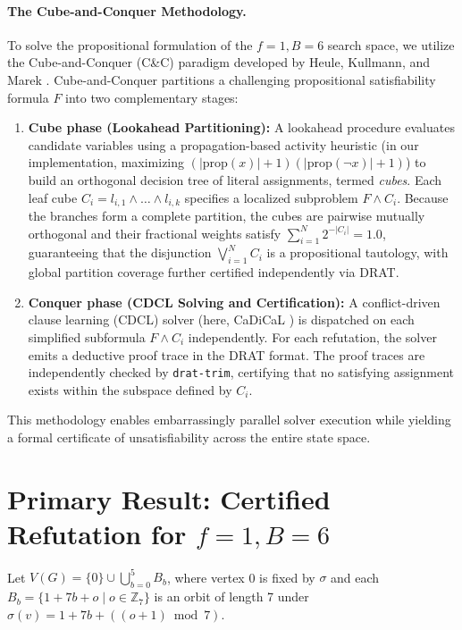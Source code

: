 \documentclass[11pt,a4paper]{article}
\theoremstyle{definition}
\begin{document}
\paragraph{The Cube-and-Conquer Methodology.}
To solve the propositional formulation of the $f=1, B=6$ search space, we utilize the Cube-and-Conquer (C\&C) paradigm developed by Heule, Kullmann, and Marek \cite{heule2016}. Cube-and-Conquer partitions a challenging propositional satisfiability formula $F$ into two complementary stages:
\begin{enumerate}
    \item \textbf{Cube phase (Lookahead Partitioning):} A lookahead procedure evaluates candidate variables using a propagation-based activity heuristic (in our implementation, maximizing $(|\text{prop}(x)|+1)(|\text{prop}(\neg x)|+1)$) to build an orthogonal decision tree of literal assignments, termed \emph{cubes}. Each leaf cube $C_i = l_{i,1} \land \dots \land l_{i,k}$ specifies a localized subproblem $F \land C_i$. Because the branches form a complete partition, the cubes are pairwise mutually orthogonal and their fractional weights satisfy $\sum_{i=1}^{N} 2^{-|C_i|} = 1.0$, guaranteeing that the disjunction $\bigvee_{i=1}^{N} C_i$ is a propositional tautology, with global partition coverage further certified independently via DRAT.
    \item \textbf{Conquer phase (CDCL Solving and Certification):} A conflict-driven clause learning (CDCL) solver (here, CaDiCaL \cite{biere2024}) is dispatched on each simplified subformula $F \land C_i$ independently. For each refutation, the solver emits a deductive proof trace in the DRAT format. The proof traces are independently checked by \texttt{drat-trim}, certifying that no satisfying assignment exists within the subspace defined by $C_i$.
\end{enumerate}
This methodology enables embarrassingly parallel solver execution while yielding a formal certificate of unsatisfiability across the entire state space.

\section{Primary Result: Certified Refutation for \texorpdfstring{$f=1, B=6$}{f=1, B=6}}

Let $V(G) = \{0\} \cup \bigcup_{b=0}^{5} B_b$, where vertex 0 is fixed by $\sigma$ and each $B_b = \{1 + 7b + o \mid o \in \mathbb{Z}_7\}$ is an orbit of length 7 under $\sigma(v) = 1 + 7b + ((o + 1) \bmod 7)$.
\end{document}
